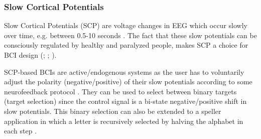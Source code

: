 \documentclass[12pt]{article}
\newcommand\mysubsubsection[1]{\subsubsection{#1}}
\numberwithin{equation}{section}
\numberwithin{figure}{section}
\numberwithin{table}{section}
\begin{document}
\mysubsubsection{Slow Cortical Potentials}\label{seq:bci_scp}
\par{
    Slow Cortical Potentials (SCP) are voltage changes in EEG which occur
    slowly over time, e.g. between 0.5-10 seconds \citep{wolpaw_brain_2010}.
    The fact that these slow potentials can be consciously regulated
    by healthy and paralyzed people, makes SCP a choice for BCI design
    (\citealp{birbaumer_thought_2000}; \citealp{hinterberger_brain-computer_2004}; \citealp{birbaumer_breaking_2006}).
}
\par{
    SCP-based BCIs are active/endogenous systems as the user has to voluntarily adjust
    the polarity (negative/positive) of their slow potentials according to some neurofeedback protocol \citep{jackson_neural_2010}.
    They can be used to select between binary targets (target selection) since the control signal is a bi-state
    negative/positive shift in slow potentials. This binary selection can also be extended
    to a speller application in which a letter is recursively selected by halving
    the alphabet in each step \citep{birbaumer_thought_2000}.
}
\end{document}
